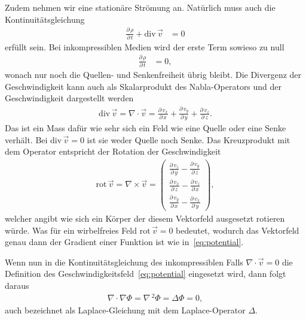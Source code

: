 Zudem nehmen wir eine stationäre Strömung an.
Natürlich muss auch die Kontinuitätsgleichung
\begin{align*}
    \frac{\partial\,\rho}{\partial\,t} + 
    \mathrm{div}\,\vec{v} &= 0
\end{align*}
erfüllt sein.
Bei inkompressiblen Medien wird der erste Term sowieso zu null
\begin{align*}
    \frac{\partial\,\rho}{\partial\,t} &= 0,
\end{align*}
wonach nur noch die Quellen- und Senkenfreiheit übrig bleibt.
Die Divergenz der Geschwindigkeit kann auch als Skalarprodukt 
des Nabla-Operators und der Geschwindigkeit dargestellt werden
\begin{align*}
    \mathrm{div}\,\vec{v}
    =
    \nabla \cdot \vec{v}
    =
    \frac{\partial\,v_x}{\partial\,x} +
    \frac{\partial\,v_y}{\partial\,y} +
    \frac{\partial\,v_z}{\partial\,z}.
\end{align*}
Das ist ein Mass dafür wie sehr sich ein Feld wie eine Quelle 
oder eine Senke verhält.
Bei $\mathrm{div}\,\vec{v} = 0$ ist sie weder Quelle noch Senke.
Das Kreuzprodukt mit dem Operator entspricht
der Rotation der Geschwindigkeit
\begin{align*}
    \mathrm{rot}\,\vec{v} 
    =
    \nabla \times \vec{v}
    =
    \begin{pmatrix}
        \frac{\partial\,v_z}{\partial\,y} - \frac{\partial\,v_y}{\partial\,z} \\
        \frac{\partial\,v_x}{\partial\,z} - \frac{\partial\,v_z}{\partial\,x} \\
        \frac{\partial\,v_y}{\partial\,x} - \frac{\partial\,v_x}{\partial\,y}
    \end{pmatrix},
\end{align*}
welcher angibt wie sich ein Körper der diesem Vektorfeld 
ausgesetzt rotieren würde.
Was für ein wirbelfreies Feld $\mathrm{rot}\,\vec{v} = 0$ bedeutet,
wodurch das Vektorfeld genau dann der Gradient einer Funktion ist
wie in~\ref{eq:potential}.

Wenn nun in die Kontinuitätsgleichung des inkompressiblen
Falls $ \nabla \cdot \vec{v} = 0$ die Definition 
des Geschwindigkeitsfeld~\ref{eq:potential} eingesetzt wird, dann folgt daraus
\begin{align}
    \nabla \cdot \nabla \Phi
    = 
    \nabla\,^2 \Phi
    =
    \Delta\Phi
    =
    0,\label{eq:laplace}
\end{align}
auch bezeichnet als Laplace-Gleichung mit dem Laplace-Operator $\Delta$.


